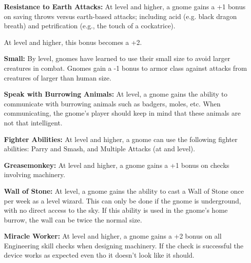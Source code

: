 \begin{multicols*}{2}
\textbf{Resistance to Earth Attacks:} At  level and higher, a gnome gains a +1 bonus on saving throws versus earth-based attacks; including acid (e.g. black dragon breath) and petrification (e.g., the touch of a cockatrice).

At  level and higher, this bonus becomes a +2.

\textbf{Small:} By  level, gnomes have learned to use their small size to avoid larger creatures in combat. Gnomes gain a -1 bonus to armor class against attacks from creatures of larger than human size.

\textbf{Speak with Burrowing Animals:} At  level, a gnome gains the ability to communicate with burrowing animals such as badgers, moles, etc. When communicating, the gnome’s player should keep in mind that these animals are not that intelligent.

\textbf{Fighter Abilities:} At  level and higher, a gnome can use the following fighter abilities: Parry and Smash, and Multiple Attacks (at  and  level).

\textbf{Greasemonkey:} At  level and higher, a gnome gains a +1 bonus on checks involving machinery.

\textbf{Wall of Stone:} At  level, a gnome gains the ability to cast a Wall of Stone once per week as a  level wizard. This can only be done if the gnome is underground, with no direct access to the sky. If this ability is used in the gnome’s home burrow, the wall can be twice the normal size.

\textbf{Miracle Worker:} At  level and higher, a gnome gains a +2 bonus on all Engineering skill checks when designing machinery. If the check is successful the device works as expected even tho it doesn’t look like it should.


\end{multicols*}
